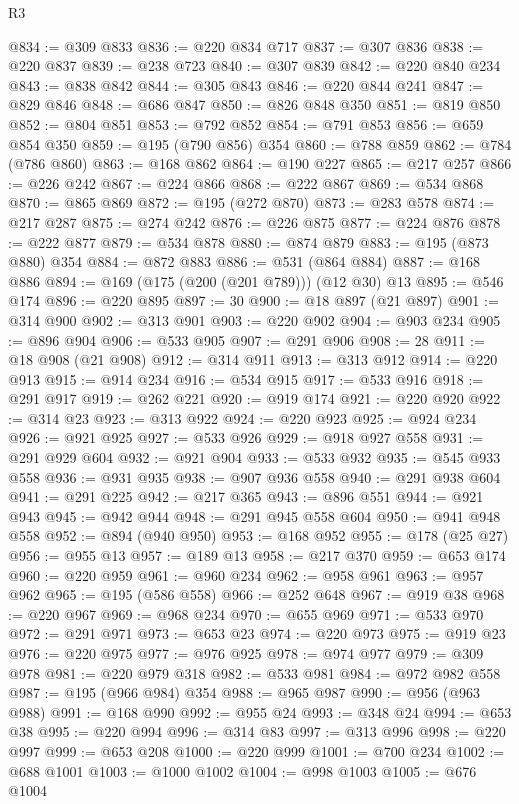 \begin{lexlean}{R3}
\begin{coremodule}
@834 := @309 @833
@836 := @220 @834 @717
@837 := @307 @836
@838 := @220 @837
@839 := @238 @723
@840 := @307 @839
@842 := @220 @840 @234
@843 := @838 @842
@844 := @305 @843
@846 := @220 @844 @241
@847 := @829 @846
@848 := @686 @847
@850 := @826 @848 @350
@851 := @819 @850
@852 := @804 @851
@853 := @792 @852
@854 := @791 @853
@856 := @659 @854 @350
@859 := @195 (@790 @856) @354
@860 := @788 @859
@862 := @784 (@786 @860)
@863 := @168 @862
@864 := @190 @227
@865 := @217 @257
@866 := @226 @242
@867 := @224 @866
@868 := @222 @867
@869 := @534 @868
@870 := @865 @869
@872 := @195 (@272 @870)
@873 := @283 @578
@874 := @217 @287
@875 := @274 @242
@876 := @226 @875
@877 := @224 @876
@878 := @222 @877
@879 := @534 @878
@880 := @874 @879
@883 := @195 (@873 @880) @354
@884 := @872 @883
@886 := @531 (@864 @884)
@887 := @168 @886
@894 := @169 (@175 (@200 (@201 @789))) (@12 @30) @13
@895 := @546 @174
@896 := @220 @895
@897 := 30
@900 := @18 @897 (@21 @897)
@901 := @314 @900
@902 := @313 @901
@903 := @220 @902
@904 := @903 @234
@905 := @896 @904
@906 := @533 @905
@907 := @291 @906
@908 := 28
@911 := @18 @908 (@21 @908)
@912 := @314 @911
@913 := @313 @912
@914 := @220 @913
@915 := @914 @234
@916 := @534 @915
@917 := @533 @916
@918 := @291 @917
@919 := @262 @221
@920 := @919 @174
@921 := @220 @920
@922 := @314 @23
@923 := @313 @922
@924 := @220 @923
@925 := @924 @234
@926 := @921 @925
@927 := @533 @926
@929 := @918 @927 @558
@931 := @291 @929 @604
@932 := @921 @904
@933 := @533 @932
@935 := @545 @933 @558
@936 := @931 @935
@938 := @907 @936 @558
@940 := @291 @938 @604
@941 := @291 @225
@942 := @217 @365
@943 := @896 @551
@944 := @921 @943
@945 := @942 @944
@948 := @291 @945 @558 @604
@950 := @941 @948 @558
@952 := @894 (@940 @950)
@953 := @168 @952
@955 := @178 (@25 @27)
@956 := @955 @13
@957 := @189 @13
@958 := @217 @370
@959 := @653 @174
@960 := @220 @959
@961 := @960 @234
@962 := @958 @961
@963 := @957 @962
@965 := @195 (@586 @558)
@966 := @252 @648
@967 := @919 @38
@968 := @220 @967
@969 := @968 @234
@970 := @655 @969
@971 := @533 @970
@972 := @291 @971
@973 := @653 @23
@974 := @220 @973
@975 := @919 @23
@976 := @220 @975
@977 := @976 @925
@978 := @974 @977
@979 := @309 @978
@981 := @220 @979 @318
@982 := @533 @981
@984 := @972 @982 @558
@987 := @195 (@966 @984) @354
@988 := @965 @987
@990 := @956 (@963 @988)
@991 := @168 @990
@992 := @955 @24
@993 := @348 @24
@994 := @653 @38
@995 := @220 @994
@996 := @314 @83
@997 := @313 @996
@998 := @220 @997
@999 := @653 @208
@1000 := @220 @999
@1001 := @700 @234
@1002 := @688 @1001
@1003 := @1000 @1002
@1004 := @998 @1003
@1005 := @676 @1004

\end{coremodule}
\end{lexlean}
